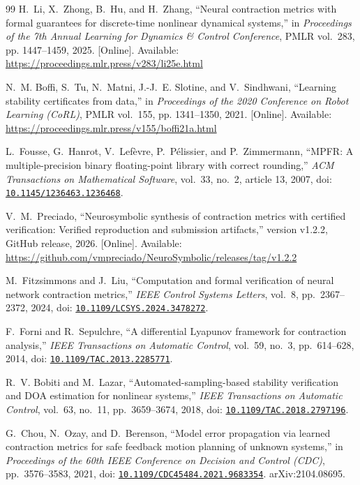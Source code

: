 \documentclass[12pt,onecolumn,journal]{IEEEtran}
\begin{document}
\begin{thebibliography}{99}
H.~Li, X.~Zhong, B.~Hu, and H.~Zhang,
``Neural contraction metrics with formal guarantees for discrete-time nonlinear dynamical systems,''
in \emph{Proceedings of the 7th Annual Learning for Dynamics \& Control Conference}, PMLR vol.~283, pp. 1447--1459, 2025. [Online]. Available: \url{https://proceedings.mlr.press/v283/li25e.html}

N.~M. Boffi, S.~Tu, N.~Matni, J.-J.~E. Slotine, and V.~Sindhwani,
``Learning stability certificates from data,''
in \emph{Proceedings of the 2020 Conference on Robot Learning (CoRL)}, PMLR vol.~155, pp. 1341--1350, 2021. [Online]. Available: \url{https://proceedings.mlr.press/v155/boffi21a.html}

L.~Fousse, G.~Hanrot, V.~Lef\`evre, P.~P\'elissier, and P.~Zimmermann,
``MPFR: A multiple-precision binary floating-point library with correct rounding,''
\emph{ACM Transactions on Mathematical Software}, vol.~33, no.~2, article 13, 2007, doi: \href{https://doi.org/10.1145/1236463.1236468}{\nolinkurl{10.1145/1236463.1236468}}.

V.~M.~Preciado,
``Neurosymbolic synthesis of contraction metrics with certified verification: Verified reproduction and submission artifacts,''
version v1.2.2, GitHub release, 2026. [Online]. Available:
\url{https://github.com/vmpreciado/NeuroSymbolic/releases/tag/v1.2.2}

M.~Fitzsimmons and J.~Liu,
``Computation and formal verification of neural network contraction metrics,''
\emph{IEEE Control Systems Letters}, vol.~8, pp.~2367--2372, 2024, doi: \href{https://doi.org/10.1109/LCSYS.2024.3478272}{\nolinkurl{10.1109/LCSYS.2024.3478272}}.

F.~Forni and R.~Sepulchre,
``A differential Lyapunov framework for contraction analysis,''
\emph{IEEE Transactions on Automatic Control}, vol.~59, no.~3, pp.~614--628, 2014, doi: \href{https://doi.org/10.1109/TAC.2013.2285771}{\nolinkurl{10.1109/TAC.2013.2285771}}.

R.~V. Bobiti and M.~Lazar,
``Automated-sampling-based stability verification and DOA estimation for nonlinear systems,''
\emph{IEEE Transactions on Automatic Control}, vol.~63, no.~11, pp.~3659--3674, 2018, doi: \href{https://doi.org/10.1109/TAC.2018.2797196}{\nolinkurl{10.1109/TAC.2018.2797196}}.

G.~Chou, N.~Ozay, and D.~Berenson,
``Model error propagation via learned contraction metrics for safe feedback motion planning of unknown systems,''
in \emph{Proceedings of the 60th IEEE Conference on Decision and Control (CDC)}, pp.~3576--3583, 2021, doi: \href{https://doi.org/10.1109/CDC45484.2021.9683354}{\nolinkurl{10.1109/CDC45484.2021.9683354}}. arXiv:2104.08695.


\end{thebibliography}
\end{document}
